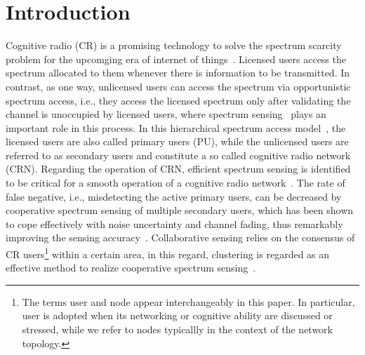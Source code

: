 \documentclass[times]{ettauth}
\newcommand{\ie}{i.e., }
\theoremstyle{mytheoremstyle}
\theoremstyle{mytheoremstyle}
\theoremstyle{mytheoremstyle}
\begin{document}

\maketitle
\graphicspath{
{../figures/04_clutering/}
}

\section{Introduction}
\label{intro}
Cognitive radio (CR) is a promising technology to solve the spectrum scarcity problem for the upcomging era of internet of things~\cite{Mitola, Rawat20161}.
Licensed users access the spectrum allocated to them whenever there is information to be transmitted.
In contrast, as one way, unlicensed users can access the spectrum via opportunistic spectrum access, \ie they access the licensed spectrum only after validating the channel is unoccupied by licensed users, where spectrum sensing~\cite{sensing_survey_2009} plays an important role in this process.
%
In this hierarchical spectrum access model~\cite{zhao_survey_DSA_2007}, the licensed users are also called primary users (PU), while the unlicensed users are referred to as secondary users and constitute a so called cognitive radio network (CRN).
%
Regarding the operation of CRN, efficient spectrum sensing is identified to be critical for a smooth operation of a cognitive radio network~\cite{Sahai_FundamentalDesignTradeoffs2006}.
The rate of false negative, \ie misdetecting the active primary users, can be decreased by cooperative spectrum sensing of multiple secondary users, which has been shown to cope effectively with noise uncertainty and channel fading, thus remarkably improving the sensing accuracy~\cite{Jacob2012, coorperativeSensing_Akyildiz11}.
Collaborative sensing relies on the consensus of CR users\footnote{The terms user and node appear interchangeably in this paper. In particular, user is adopted when its networking or cognitive ability are discussed or stressed, while we refer to nodes typicallly in the context of the network topology.} within a certain area, in this regard, clustering is regarded as an effective method to realize cooperative spectrum sensing~\cite{Sun07_clustering_spectrum_secsing}.
\end{document}
